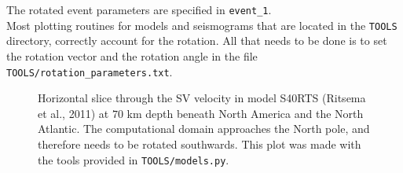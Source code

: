 The rotated event parameters are specified in \texttt{event\_1}.\\[5pt]
Most plotting routines for models and seismograms that are located in the \texttt{TOOLS} directory, correctly account for the rotation. All that needs to be done is to set the rotation vector and the rotation angle in the file \texttt{TOOLS/rotation\_parameters.txt}.

\begin{center}
\begin{figure}
\center{} 
\caption{Horizontal slice through the SV velocity in model S40RTS (Ritsema et al., 2011) at $70$ km depth beneath North America and the North Atlantic. The computational domain approaches the North pole, and therefore needs to be rotated southwards. This plot was made with the tools provided in \texttt{TOOLS/models.py}.}\label{F:NA1}
\end{figure}
\end{center}

